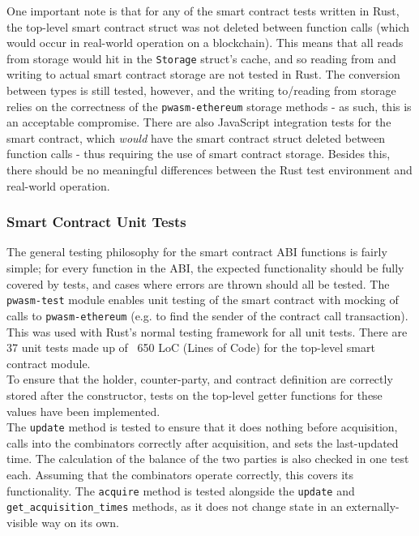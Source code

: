 One important note is that for any of the smart contract tests written in Rust, the top-level smart contract struct was not deleted between function calls (which would occur in real-world operation on a blockchain). This means that all reads from storage would hit in the \texttt{Storage} struct's cache, and so reading from and writing to actual smart contract storage are not tested in Rust. The conversion between types is still tested, however, and the writing to/reading from storage relies on the correctness of the \texttt{pwasm-ethereum} storage methods - as such, this is an acceptable compromise. There are also JavaScript integration tests for the smart contract, which \textit{would} have the smart contract struct deleted between function calls - thus requiring the use of smart contract storage. Besides this, there should be no meaningful differences between the Rust test environment and real-world operation.


\subsubsection{Smart Contract Unit Tests}

The general testing philosophy for the smart contract ABI functions is fairly simple; for every function in the ABI, the expected functionality should be fully covered by tests, and cases where errors are thrown should all be tested. The \texttt{pwasm-test} module enables unit testing of the smart contract with mocking of calls to \texttt{pwasm-ethereum} (e.g. to find the sender of the contract call transaction). This was used with Rust's normal testing framework for all unit tests. There are 37 unit tests made up of ~650 LoC (Lines of Code) for the top-level smart contract module. \\

To ensure that the holder, counter-party, and contract definition are correctly stored after the constructor, tests on the top-level getter functions for these values have been implemented. \\

The \texttt{update} method is tested to ensure that it does nothing before acquisition, calls into the combinators correctly after acquisition, and sets the last-updated time. The calculation of the balance of the two parties is also checked in one test each. Assuming that the combinators operate correctly, this covers its functionality. The \texttt{acquire} method is tested alongside the \texttt{update} and \texttt{get\_acquisition\_times} methods, as it does not change state in an externally-visible way on its own. \\

